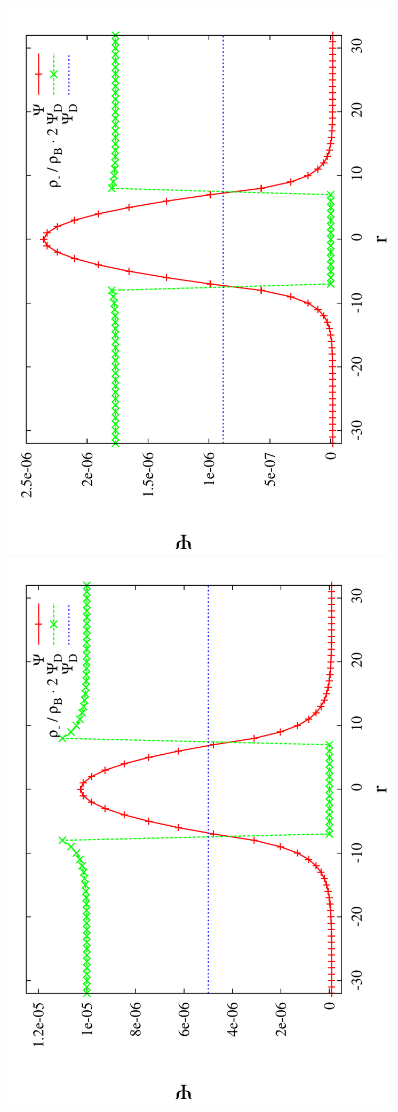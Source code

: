 \documentclass[aps,pre,preprint,groupedaddress]{revtex4-1}
\begin{document}
\begin{figure}[h!t]
\includegraphics[angle=-90,width=0.9\textwidth]{test_dh1.pdf}\\
\includegraphics[angle=-90,width=0.9\textwidth]{test_dh2.pdf}

\end{figure}
\end{document}
